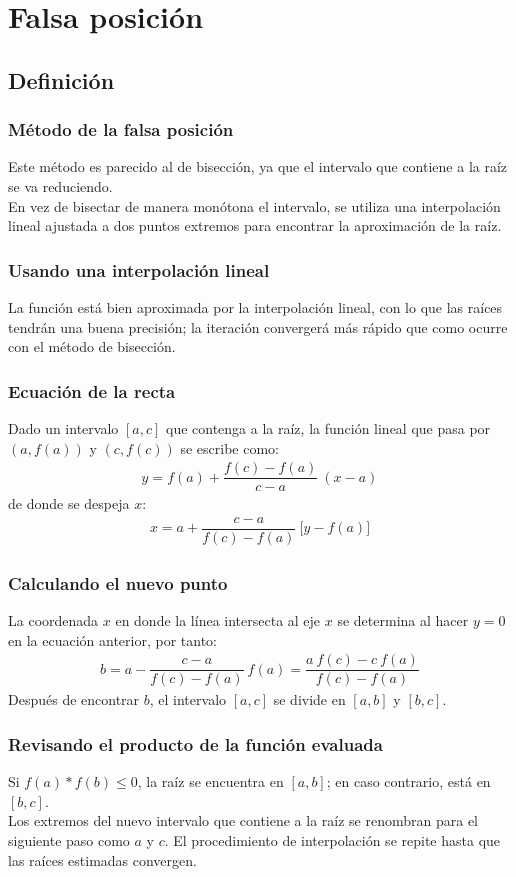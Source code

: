 \documentclass[12pt]{beamer}
\begin{document}
\section{Falsa posición}
\subsection{Definición}

\begin{frame}
\frametitle{Método de la falsa posición}
Este método es parecido al de bisección, ya que el intervalo que contiene a la raíz se va reduciendo.
\\
\bigskip
\pause
En vez de bisectar de manera monótona el intervalo, se utiliza una interpolación lineal ajustada a dos puntos extremos para encontrar la aproximación de la raíz.
\end{frame}
\begin{frame}
\frametitle{Usando una interpolación lineal}
La función está bien aproximada por la interpolación lineal, con lo que las raíces tendrán una buena precisión; la iteración convergerá más rápido que como ocurre con el método de bisección.
\end{frame}
\begin{frame}
\frametitle{Ecuación de la recta}
Dado un intervalo $[a, c]$ que contenga a la raíz, la función lineal que pasa por $(a, f(a))$ y $(c, f(c))$ se escribe como:
\pause
\begin{align*}
y = f (a) + \dfrac{f (c) - f (a)}{c - a} \: (x - a)
\end{align*}
\pause
de donde se despeja $x$:
\pause
\begin{align*}
x = a + \dfrac{c - a}{f (c) - f (a)} \: \big[ y - f (a)\big]
\end{align*}
\end{frame}
\begin{frame}
\frametitle{Calculando el nuevo punto}
La coordenada $x$ en donde la línea intersecta al eje $x$ se determina al hacer $y = 0$ en la ecuación anterior, por tanto:
\pause
\begin{align*}
b = a - \dfrac{c - a}{f (c) - f (a)} \: f(a) = \dfrac{a \: f (c) - c \: f (a)}{f (c)-f (a)}
\end{align*}
Después de encontrar $b$, el intervalo $[a, c]$ se divide en $[a, b]$ y $[b, c]$.
\end{frame}
\begin{frame}
\frametitle{Revisando el producto de la función evaluada}
Si $f (a) * f (b) \leq 0$, la raíz se encuentra en $[a, b]$; \pause en caso contrario, está en $[b, c]$. 
\\
\bigskip
\pause
Los extremos del nuevo intervalo que contiene a la raíz se renombran para el siguiente paso como $a$ y $c$. \pause El procedimiento de interpolación se repite hasta que las raíces estimadas convergen.
\end{frame}
\end{document}
